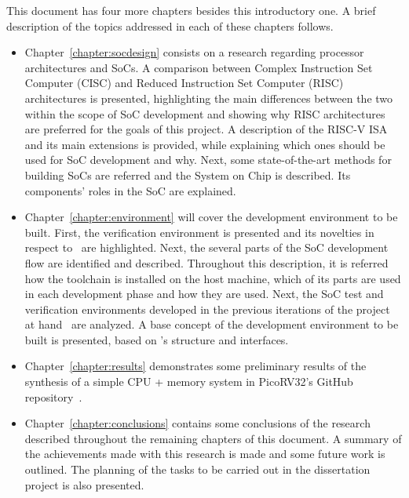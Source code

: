 This document has four more chapters besides this introductory one. A brief
description of the topics addressed in each of these chapters follows.

\begin{itemize}
\item Chapter~\ref{chapter:socdesign} consists on a research regarding processor
  architectures and SoCs. A comparison between Complex Instruction Set Computer
  (CISC) and Reduced Instruction Set Computer (RISC) architectures is presented,
  highlighting the main differences between the two within the scope of SoC
  development and showing why RISC architectures are preferred for the goals of
  this project. A description of the RISC-V ISA and its main extensions is
  provided, while explaining which ones should be used for SoC development
  and why. Next, some state-of-the-art methods for building SoCs are referred
  and the \socname System on Chip is described. Its components' roles in the SoC
  are explained.

\item Chapter~\ref{chapter:environment} will cover the development environment
  to be built. First, the verification environment is presented and its novelties
  in respect to~\cite{bib:warpbird} are highlighted. Next, the several parts of the 
  SoC development flow are identified and described. Throughout this description, 
  it is referred how the toolchain is installed on the host machine, which of its 
  parts are used in each development phase and how they are used. Next, the SoC test 
  and verification environments developed in the previous iterations of the project
  at hand~\cite{bib:blackbird,bib:warpbird} are analyzed. A base concept of the
  development environment to be built is presented, based on \socname's
  structure and interfaces.

\item Chapter~\ref{chapter:results} demonstrates some preliminary results of the
  synthesis of a simple CPU + memory system in PicoRV32's GitHub
  repository~\cite{bib:picorv32}.

\item Chapter~\ref{chapter:conclusions} contains some conclusions of the
  research described throughout the remaining chapters of this document. A
  summary of the achievements made with this research is made and some future
  work is outlined. The planning of the tasks to be carried out in the dissertation
  project is also presented.
\end{itemize}


